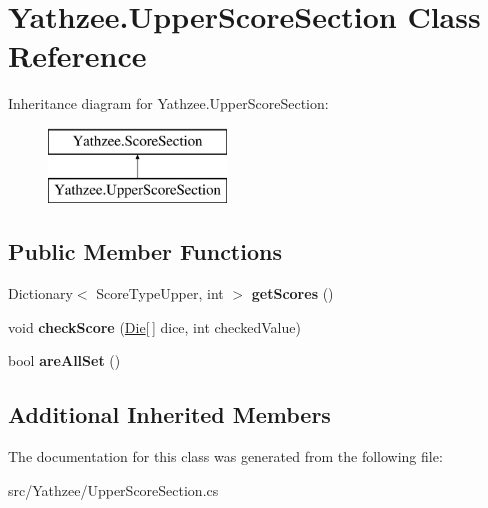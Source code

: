 \hypertarget{class_yathzee_1_1_upper_score_section}{}\section{Yathzee.\+Upper\+Score\+Section Class Reference}
\label{class_yathzee_1_1_upper_score_section}
Inheritance diagram for Yathzee.\+Upper\+Score\+Section\+:\begin{figure}[H]
\begin{center}
\leavevmode
\includegraphics[height=2.000000cm]{class_yathzee_1_1_upper_score_section}
\end{center}
\end{figure}
\subsection*{Public Member Functions}
\begin{DoxyCompactItemize}
\item 
Dictionary$<$ Score\+Type\+Upper, int $>$ {\bfseries get\+Scores} ()\hypertarget{class_yathzee_1_1_upper_score_section_aa10b4b6d4c7038e80c9d221bfb482b72}{}\label{class_yathzee_1_1_upper_score_section_aa10b4b6d4c7038e80c9d221bfb482b72}

\item 
void {\bfseries check\+Score} (\hyperlink{class_yathzee_1_1_die}{Die}\mbox{[}$\,$\mbox{]} dice, int checked\+Value)\hypertarget{class_yathzee_1_1_upper_score_section_ae2db6ea707243900dc1b87cdc4ff9e2f}{}\label{class_yathzee_1_1_upper_score_section_ae2db6ea707243900dc1b87cdc4ff9e2f}

\item 
bool {\bfseries are\+All\+Set} ()\hypertarget{class_yathzee_1_1_upper_score_section_ab539f23446aface95d748a3ebc5396d2}{}\label{class_yathzee_1_1_upper_score_section_ab539f23446aface95d748a3ebc5396d2}

\end{DoxyCompactItemize}
\subsection*{Additional Inherited Members}


The documentation for this class was generated from the following file\+:\begin{DoxyCompactItemize}
\item 
src/\+Yathzee/Upper\+Score\+Section.\+cs\end{DoxyCompactItemize}
